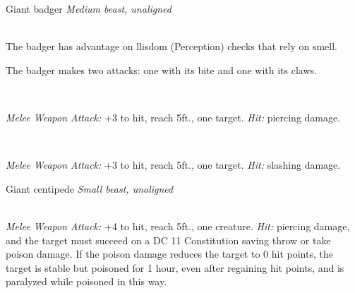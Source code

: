 \documentclass[10pt,twoside,twocolumn,openany]{book}
\begin{document}
\begin{monsterboxnobg}{Giant badger}
	\textit{Medium beast, unaligned}\\
	\hline
	\basics[
		armorclass	= 10,
		hitpoints 		= \dice{2d8 + 4},
		speed		= {30 ft., burrow 10 ft.}
	]
	\hline
	\stats[
		STR	= \stat{13},
		DEX	= \stat{10},
		CON	= \stat{15},
		INT	= \stat{2},
		WIS	= \stat{12},
		CHA	= \stat{5}
	]
	\hline
	\details[
		skills			= {},
		senses		= {darkvision 30 ft., passive Perception 11},
		languages		= {-},
		challenge		= 1/4
	]
	\hline \\[1mm]
	\begin{monsteraction}
		The badger has advantage on llisdom (Perception) checks that rely on smell.
	\end{monsteraction}
	\begin{monsteraction}[Multiattack]
		The badger makes two attacks: one with its bite and one with its claws.
	\end{monsteraction}\\
	\begin{monsteraction}[Bite]
		\textit{Melee Weapon Attack:} +3 to hit, reach 5ft., one target. \textit{Hit:}  piercing damage.
	\end{monsteraction}\\
	\begin{monsteraction}[Claws]
		\textit{Melee Weapon Attack:} +3 to hit, reach 5ft., one target. \textit{Hit:}  slashing damage.
	\end{monsteraction}
\end{monsterboxnobg}

\begin{monsterboxnobg}{Giant centipede}
	\textit{Small beast, unaligned}\\
	\hline
	\basics[
		armorclass	= 13 (natural armor),
		hitpoints 		= \dice{1d6 + 1},
		speed		= {30 ft., climb 30 ft.}
	]
	\hline
	\stats[
		STR	= \stat{5},
		DEX	= \stat{14},
		CON	= \stat{12},
		INT	= \stat{1},
		WIS	= \stat{7},
		CHA	= \stat{3}
	]
	\hline
	\details[
		skills			= {},
		senses		= {blindsight 30 ft., passive Perception 8},
		languages		= {-},
		challenge		= 1/4
	]
	\hline \\[1mm]
	\begin{monsteraction}[Bite]
		\textit{Melee Weapon Attack:} +4 to hit, reach 5ft., one creature. \textit{Hit:}  piercing damage, and the target must succeed on a DC 11 Constitution saving throw or take  poison damage. If the poison damage reduces the target to 0 hit points, the target is stable but poisoned for 1 hour, even after regaining hit points, and is paralyzed while poisoned in this way.
	\end{monsteraction}
\end{monsterboxnobg}
\end{document}
